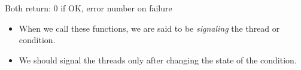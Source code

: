 \documentclass[]{article}
\begin{document}



Both return: 0 if OK, error number on failure

\begin{itemize}
\item When we call these functions, we are said to be \emph{signaling} the
thread or condition.
\item We should signal the threads only after changing the state of the
condition.
\end{itemize}
\end{document}
